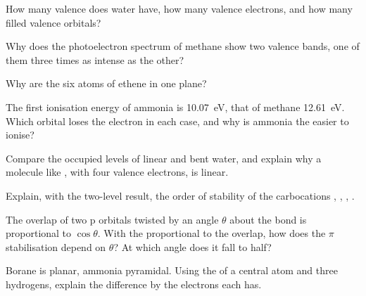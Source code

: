 \begin{exercise}[$\star$]\label{exo:b2:fragment-orbitals:2}
How many valence  does water have, how many valence electrons,
and how many filled valence orbitals?
\end{exercise}

\begin{exercise}[$\star$]\label{exo:b2:fragment-orbitals:3}
Why does the photoelectron spectrum of methane show two valence bands, one of them
three times as intense as the other?
\end{exercise}

\begin{exercise}[$\star$]\label{exo:b2:fragment-orbitals:4}
Why are the six atoms of ethene in one plane?
\end{exercise}

\begin{exercise}[$\star\star$]\label{exo:b2:fragment-orbitals:5}
The first ionisation energy of ammonia is \qty{10.07}{eV}, that of methane
\qty{12.61}{eV}. Which orbital loses the electron in each case, and why is ammonia the
easier to ionise?
\end{exercise}

\begin{exercise}[$\star\star$]\label{exo:b2:fragment-orbitals:6}
Compare the occupied levels of linear and bent water, and explain why a molecule
like , with four valence electrons, is linear.
\end{exercise}

\begin{exercise}[$\star\star$]\label{exo:b2:fragment-orbitals:7}
Explain, with the two-level result, the order of stability of the carbocations
, , , .
\end{exercise}

\begin{exercise}[$\star\star$]\label{exo:b2:fragment-orbitals:8}
The overlap of two p orbitals twisted by an angle $\theta$ about the bond is
proportional to $\cos\theta$. With the  proportional to the
overlap, how does the $\pi$ stabilisation depend on $\theta$? At which angle does it
fall to half?
\end{exercise}

\begin{exercise}[$\star\star$]\label{exo:b2:fragment-orbitals:9}
Borane  is planar, ammonia pyramidal. Using the  of a
central atom and three hydrogens, explain the difference by the electrons each has.
\end{exercise}

